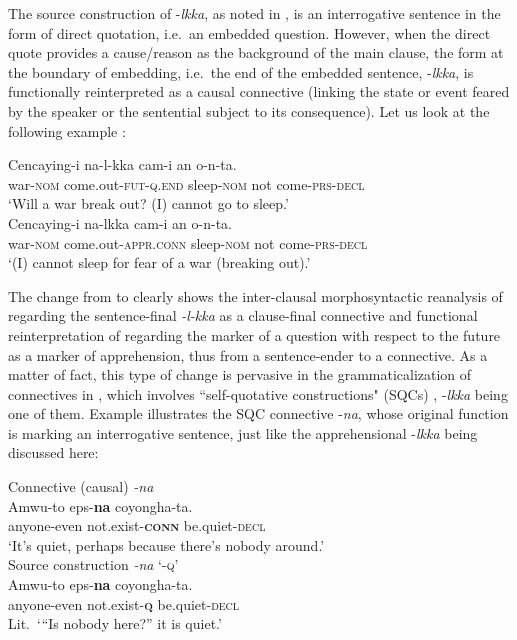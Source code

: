 \documentclass[output=paper,colorlinks,citecolor=brown]{langscibook}
\begin{document}
The source construction of \nobreakdash-\textit{lkka}, as noted in , is an interrogative sentence in the form of direct quotation, i.e.\  an embedded question. However, when the direct quote provides a cause/reason as the background of the main clause, the form at the boundary of embedding, i.e.\  the end of the embedded sentence, \nobreakdash-\textit{lkka}, is functionally reinterpreted as a causal connective (linking the state or event feared by the speaker or the sentential subject to its consequence). Let us look at the following example :


\ea \label{ex:RK18}
\ea \label{ex:RK18a}
\gll Cencaying-i na-l-kka cam-i an o-n-ta. \\
war-\textsc{nom} come.out-\textsc{fut-q.end} sleep-\textsc{nom} not come-\textsc{prs-decl} \\
\glt `Will a war break out? (I) cannot go to sleep.' \\
\ex \label{ex:RK18b}
\gll Cencaying-i na-lkka cam-i an o-n-ta. \\
war-\textsc{nom} come.out-\textsc{appr.conn} sleep-\textsc{nom} not come-\textsc{prs-decl} \\
\glt `(I) cannot sleep for fear of a war (breaking out).'
\z
\z

\noindent The change from  to  clearly shows the inter-clausal morphosyntactic reanalysis of regarding the sentence-final \textit{-l-kka} as a clause-final connective and functional reinterpretation of regarding the marker of a question with respect to the future as a marker of apprehension, thus from a sentence-ender to a connective. As a matter of fact, this type of change is pervasive in the grammaticalization of connectives in , which involves ``self-quotative constructions" (SQCs) \citep[256]{KooRhee2019}, \nobreakdash-\textit{lkka} being one of them. Example  illustrates the SQC connective \nobreakdash-\textit{na}, whose original function is marking an interrogative sentence, just like the apprehensional \nobreakdash-\textit{lkka} being discussed here:

\ea \label{ex:RK19}
\ea \label{ex:RK19a} \textnormal{Connective (causal)} \textit{-na} \\
\gll Amwu-to eps-\textbf{na} coyongha-ta. \\
anyone-even not.exist-\textsc{\textbf{conn}} be.quiet-\textsc{decl} \\
\glt `It's quiet, perhaps because there's nobody around.' \\
\ex \label{ex:RK19b} \textnormal{Source construction \textit{-na} \textsc{`-q'}} \\
\gll Amwu-to eps-\textbf{na} coyongha-ta. \\
anyone-even not.exist-\textsc{\textbf{q}} be.quiet-\textsc{decl} \\
\glt Lit.\ {`}``Is nobody here?'' it is quiet.' \citep[267]{KooRhee2019} \\
\z
\z
\end{document}
